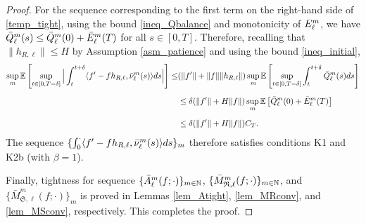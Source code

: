 \documentclass{article}
\theoremstyle{definition}
\numberwithin{equation}{section}
\begin{document}
\begin{proof}
For the sequence corresponding to the first term on the right-hand side of \eqref{temp_tight}, using the bound \eqref{ineq_Qbalance} and monotonicity of $E_\ell^m$, we have $\bar {Q}^m_\ell(s) \leq \bar {Q}_\ell^m(0)+ \bar E_\ell^m(T)$ for all $s\in[0,T]$. Therefore, recalling that $\|h_{R,\ell}\|\leq H$ by Assumption \ref{asm_patience} and using the bound \eqref{ineq_initial},
\begin{align}\label{temp_tight1}
\sup_{m}\mathbb{E}\left[\sup_{t\in[0,T-\delta]}\Big| \int_{t}^{t+\delta}\langle f'-fh_{R,\ell},\bar{\nu}^m_\ell(s)\rangle ds \Big|\right]\leq & (\|f'\|+\|f\|\|h_{R,\ell}\|)\sup_{m}\mathbb{E}\left[\sup_{t\in[0,T-\delta]} \int_t^{t+\delta}\bar {Q}^m_\ell(s) ds \right]\notag\\[2mm]
&\leq \delta(\|f'\|+H\|f\|)\sup_{m}\mathbb{E}\left[\bar {Q}_\ell^m(0)+ \bar E_\ell^m(T)\right]\notag\\[2mm]
&\leq \delta(\|f'\|+H\|f\|)C_{T}.
\end{align}
The sequence $\{\int_{0}^{\cdot}\langle f'-fh_{R,\ell},\bar{\nu}^m_\ell(s)\rangle ds\}_m$ therefore satisfies conditions K1 and K2b (with $\beta=1$). 

Finally, tightness for sequence $\{\bar A^m_\ell(f;\cdot)\}_{m\in\mathbb{N}}$, $\{\bar M^m_{\mathfrak{R},\ell}(f;\cdot)\}_{m\in\mathbb{N}}$, and $\{\bar M^m_{\mathfrak{S},\ell}(f;\cdot)\}_m$ is proved in Lemmas  \ref{lem_Atight}, \ref{lem_MRconv}, and \ref{lem_MSconv}, respectively. This completes the proof.
\end{proof}
\end{document}
